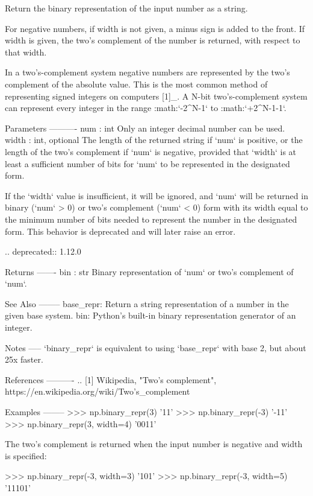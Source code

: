 \begin{DoxyVerb}Return the binary representation of the input number as a string.

For negative numbers, if width is not given, a minus sign is added to the
front. If width is given, the two's complement of the number is
returned, with respect to that width.

In a two's-complement system negative numbers are represented by the two's
complement of the absolute value. This is the most common method of
representing signed integers on computers [1]_. A N-bit two's-complement
system can represent every integer in the range
:math:`-2^{N-1}` to :math:`+2^{N-1}-1`.

Parameters
----------
num : int
    Only an integer decimal number can be used.
width : int, optional
    The length of the returned string if `num` is positive, or the length
    of the two's complement if `num` is negative, provided that `width` is
    at least a sufficient number of bits for `num` to be represented in the
    designated form.

    If the `width` value is insufficient, it will be ignored, and `num` will
    be returned in binary (`num` > 0) or two's complement (`num` < 0) form
    with its width equal to the minimum number of bits needed to represent
    the number in the designated form. This behavior is deprecated and will
    later raise an error.

    .. deprecated:: 1.12.0

Returns
-------
bin : str
    Binary representation of `num` or two's complement of `num`.

See Also
--------
base_repr: Return a string representation of a number in the given base
           system.
bin: Python's built-in binary representation generator of an integer.

Notes
-----
`binary_repr` is equivalent to using `base_repr` with base 2, but about 25x
faster.

References
----------
.. [1] Wikipedia, "Two's complement",
    https://en.wikipedia.org/wiki/Two's_complement

Examples
--------
>>> np.binary_repr(3)
'11'
>>> np.binary_repr(-3)
'-11'
>>> np.binary_repr(3, width=4)
'0011'

The two's complement is returned when the input number is negative and
width is specified:

>>> np.binary_repr(-3, width=3)
'101'
>>> np.binary_repr(-3, width=5)
'11101'\end{DoxyVerb}
 \mbox{\label{namespacenumpy_1_1core_1_1numeric_af1d206f80ecc160a47c672986d063595}} 
